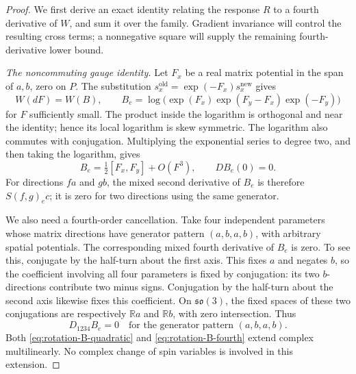 \begin{proof}
We first derive an exact identity relating the response \(R\) to a fourth
derivative of \(W\), and sum it over the family.  Gradient invariance will
control the resulting cross terms; a nonnegative square will supply the
remaining fourth-derivative lower bound.

\medskip\noindent
\emph{The noncommuting gauge identity.}
Let \(F_x\) be a real matrix potential in the span of \(a,b\), zero
on \(P\). The substitution
\(s_x^{\mathrm{old}}=\exp(-F_x)s_x^{\mathrm{new}}\) gives
\begin{equation}
\label{eq:rotation-nonabelian-gauge}
W(dF)=W(B),\qquad
B_e=\log\bigl(\exp(F_x)\exp(F_y-F_x)\exp(-F_y)\bigr)
\end{equation}
for \(F\) sufficiently small. The product inside the logarithm is
orthogonal and near the identity; hence its local logarithm is skew
symmetric. The logarithm also commutes with conjugation. Multiplying
the exponential series to degree two, and then taking the logarithm,
gives
\begin{equation}
\label{eq:rotation-B-quadratic}
B_e=\tfrac12[F_x,F_y]+O(F^3),\qquad DB_e(0)=0.
\end{equation}
For directions \(fa\) and \(gb\), the mixed second derivative of
\(B_e\) is therefore \(S(f,g)_e c\); it is zero for two directions
using the same generator.

We also need a fourth-order cancellation. Take four independent
parameters whose matrix directions have generator pattern \((a,b,a,b)\),
with arbitrary spatial potentials. The corresponding mixed fourth
derivative of \(B_e\) is zero. To see this, conjugate by the half-turn
about the first axis. This fixes \(a\) and negates \(b\), so the
coefficient involving all four parameters is fixed by conjugation:
its two \(b\)-directions contribute two minus signs. Conjugation by
the half-turn about the second axis likewise fixes this coefficient.
On \(\mathfrak{so}(3)\), the fixed spaces of these two conjugations
are respectively \(\mathbb R a\) and \(\mathbb R b\), with zero
intersection. Thus
\begin{equation}
\label{eq:rotation-B-fourth}
D_{1234}B_e=0
\quad\text{for the generator pattern }(a,b,a,b).
\end{equation}
Both \eqref{eq:rotation-B-quadratic} and
\eqref{eq:rotation-B-fourth} extend complex multilinearly. No complex
change of spin variables is involved in this extension.


\end{proof}
